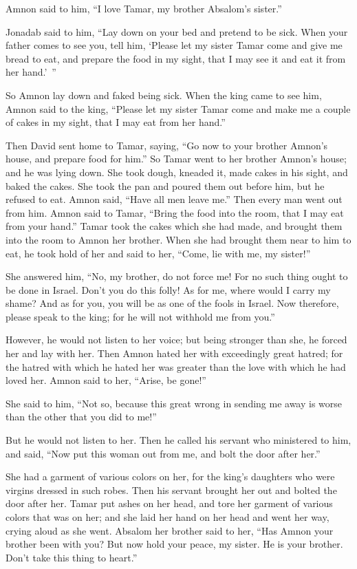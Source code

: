 Amnon said to him, “I love Tamar, my brother Absalom’s sister.”

\myverse{}Jonadab said to him, “Lay down on your bed and pretend to be sick.
When your father comes to see you, tell him, ‘Please let my sister Tamar come and give me bread to eat,
and prepare the food in my sight, that I may see it and eat it from her hand.’ ”

\myverse{}So Amnon lay down and faked being sick. When the king came to
see him, Amnon said to the king, “Please let my sister Tamar come and make me a couple of cakes in my
sight, that I may eat from her hand.”

\myverse{}Then David sent home to Tamar, saying, “Go now to your brother
Amnon’s house, and prepare food for him.”
\myverse{}So Tamar went to her brother Amnon’s house; and he was lying down. She took
dough, kneaded it, made cakes in his sight, and baked the cakes.
\myverse{}She took the pan and poured them out before him, but he refused to eat. Amnon
said, “Have all men leave me.” Then every man went out from him.
\myverse{}Amnon said to Tamar, “Bring the food into the room, that I may eat from your
hand.” Tamar took the cakes which she had made, and brought them into the room to Amnon her brother.
\myverse{}When she had brought them near to him to eat, he took hold of her and said
to her, “Come, lie with me, my sister!”

\myverse{}She answered him, “No, my brother, do not force me! For no such
thing ought to be done in Israel. Don’t you do this folly!
\myverse{}As for me, where would I carry my shame? And as for you, you will be as one
of the fools in Israel. Now therefore, please speak to the king; for he will not withhold me from you.”

\myverse{}However, he would not listen to her voice; but being stronger
than she, he forced her and lay with her.
\myverse{}Then Amnon hated her with exceedingly great hatred; for the hatred with which
he hated her was greater than the love with which he had loved her. Amnon said to her, “Arise, be gone!”

\myverse{}She said to him, “Not so, because this great wrong in sending
me away is worse than the other that you did to me!”

But he would not listen to her.
\myverse{}Then he called his servant who ministered to him, and said, “Now put this
woman out from me, and bolt the door after her.”

\myverse{}She had a garment of various colors on her, for the king’s daughters
who were virgins dressed in such robes. Then his servant brought her out and bolted the door after her.
\myverse{}Tamar put ashes on her head, and tore her garment of various colors that
was on her; and she laid her hand on her head and went her way, crying aloud as she went.
\myverse{}Absalom her brother said to her, “Has Amnon your brother been with you? But
now hold your peace, my sister. He is your brother. Don’t take this thing to heart.”

